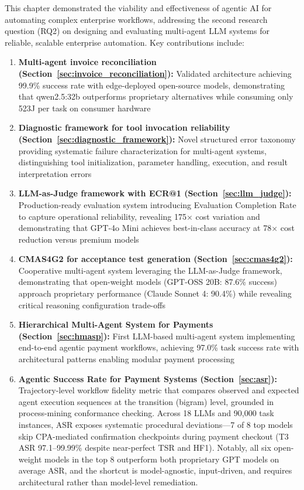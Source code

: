 This chapter demonstrated the viability and effectiveness of agentic AI for automating complex enterprise workflows, addressing the second research question (RQ2) on designing and evaluating multi-agent LLM systems for reliable, scalable enterprise automation. Key contributions include:

\begin{enumerate}[leftmargin=*]
    \item \textbf{Multi-agent invoice reconciliation (Section~\ref{sec:invoice_reconciliation}):} Validated architecture achieving 99.9\% success rate with edge-deployed open-source models, demonstrating that qwen2.5:32b outperforms proprietary alternatives while consuming only 523J per task on consumer hardware
    
    \item \textbf{Diagnostic framework for tool invocation reliability (Section~\ref{sec:diagnostic_framework}):} Novel structured error taxonomy providing systematic failure characterization for multi-agent systems, distinguishing tool initialization, parameter handling, execution, and result interpretation errors
    
    \item \textbf{LLM-as-Judge framework with ECR@1 (Section~\ref{sec:llm_judge}):} Production-ready evaluation system introducing Evaluation Completion Rate to capture operational reliability, revealing 175$\times$ cost variation and demonstrating that GPT-4o Mini achieves best-in-class accuracy at 78$\times$ cost reduction versus premium models
    
    \item \textbf{CMAS4G2 for acceptance test generation (Section~\ref{sec:cmas4g2}):} Cooperative multi-agent system leveraging the LLM-as-Judge framework, demonstrating that open-weight models (GPT-OSS 20B: 87.6\% success) approach proprietary performance (Claude Sonnet 4: 90.4\%) while revealing critical reasoning configuration trade-offs
    
    \item \textbf{Hierarchical Multi-Agent System for Payments (Section~\ref{sec:hmasp}):} First LLM-based multi-agent system implementing end-to-end agentic payment workflows, achieving 97.0\% task success rate with architectural patterns enabling modular payment processing
    
    \item \textbf{Agentic Success Rate for Payment Systems (Section~\ref{sec:asr}):} Trajectory-level workflow fidelity metric that compares observed and expected agent execution sequences at the transition (bigram) level, grounded in process-mining conformance checking. Across 18 LLMs and 90{,}000 task instances, ASR exposes systematic procedural deviations---7 of 8 top models skip CPA-mediated confirmation checkpoints during payment checkout (T3 ASR 97.1--99.99\% despite near-perfect TSR and HF1). Notably, all six open-weight models in the top 8 outperform both proprietary GPT models on average ASR, and the shortcut is model-agnostic, input-driven, and requires architectural rather than model-level remediation.


\end{enumerate}
